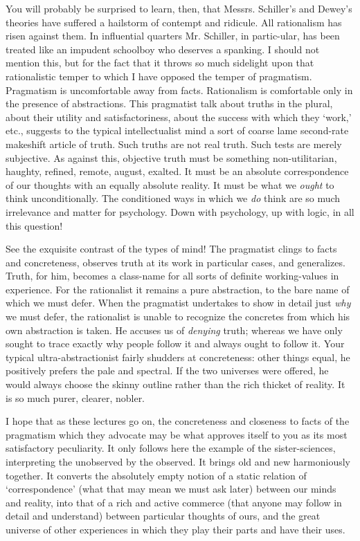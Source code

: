 You will probably be surprised to learn, then, that Messrs. Schiller's
and Dewey's theories have suffered a hailstorm of contempt and
ridicule. All rationalism has risen against them. In influential
quarters Mr. Schiller, in partic-ular, has been treated like
an impudent schoolboy who deserves a spanking. I should not mention
this, but for the fact that it throws so much sidelight upon that
rationalistic temper to which I have opposed the temper of pragmatism.
Pragmatism is uncomfortable away from facts. Rationalism is
comfortable only in the presence of abstractions. This pragmatist talk
about truths in the plural, about their utility and satisfactoriness,
about the success with which they `work,' etc., suggests to the
typical intellectualist mind a sort of coarse lame second-rate
makeshift article of truth. Such truths are not real truth. Such tests
are merely subjective. As against this, objective truth must be
something non-utilitarian, haughty, refined, remote, august, exalted.
It must be an absolute correspondence of our thoughts with an equally
absolute reality. It must be what we \textit{ought} to think
unconditionally. The conditioned ways in which we \textit{do} think
are so much irrelevance and matter for psychology. Down with
psychology, up with logic, in all this question!

See the exquisite contrast of the types of mind! The
pragmatist clings to facts and concreteness, observes truth at its
work in particular cases, and generalizes. Truth, for him, becomes a
class-name for all sorts of definite working-values in experience. For
the rationalist it remains a pure abstraction, to the bare name of
which we must defer. When the pragmatist undertakes to show in detail
just \textit{why} we must defer, the rationalist is unable to
recognize the concretes from which his own abstraction is taken. He
accuses us of \textit{denying} truth; whereas we have only sought to
trace exactly why people follow it and always ought to follow it. Your
typical ultra-abstractionist fairly shudders at concreteness: other
things equal, he positively prefers the pale and spectral. If the two
universes were offered, he would always choose the skinny outline
rather than the rich thicket of reality. It is so much purer, clearer,
nobler.

I hope that as these lectures go on, the concreteness and closeness to
facts of the pragmatism which they advocate may be what approves
 itself to you as its most satisfactory peculiarity. It only
follows here the example of the sister-sciences, interpreting the
unobserved by the observed. It brings old and new harmoniously
together. It converts the absolutely empty notion of a static
relation of `correspondence' (what that may mean we must ask later)
between our minds and reality, into that of a rich and active commerce
(that anyone may follow in detail and understand) between particular
thoughts of ours, and the great universe of other experiences in
which they play their parts and have their uses.

